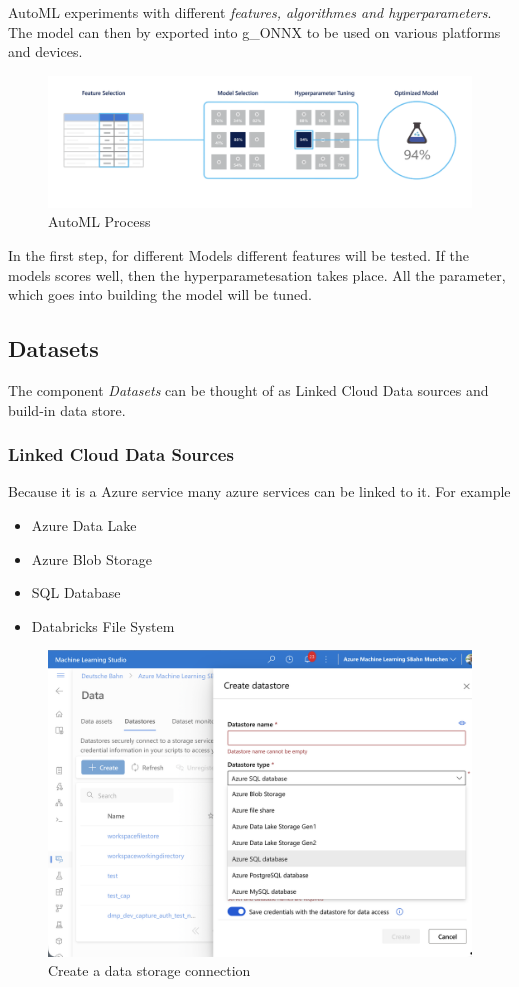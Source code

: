 AutoML experiments with different \textit{features, algorithmes and hyperparameters}. The model can then by exported into \gls{g_ONNX} to be used on various platforms and devices. 

\begin{figure}[H]
	\centering
	\includegraphics[scale = 0.4]{attachment/chapter_10/Scc004}
	\caption{AutoML Process}
\end{figure}

In the first step, for different Models different features will be tested. If the models scores well, then the hyperparametesation takes place. All the parameter, which goes into building the model will be tuned.

\subsection{Datasets}
The component \textit{Datasets} can be thought of as Linked Cloud Data sources and build-in data store.

\subsubsection{Linked Cloud Data Sources}

Because it is a Azure service many azure services can be linked to it. For example
\begin{itemize}
	\item Azure Data Lake
	\item Azure Blob Storage
	\item SQL Database
	\item Databricks File System
\end{itemize}

\begin{figure}[H]
	\centering
	\includegraphics[scale = 0.2]{attachment/chapter_10/Scc028}
	\caption{Create a data storage connection}
\end{figure}

